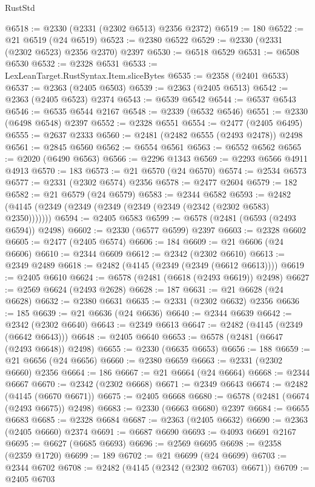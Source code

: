 \begin{lexlean}{RustStd}
\begin{coremodule}
@6518 := @2330 (@2331 (@2302 @6513) @2356 @2372)
@6519 := 180
@6522 := @21 @6519 (@24 @6519)
@6523 := @2380 @6522
@6529 := @2330 (@2331 (@2302 @6523) @2356 @2370) @2397
@6530 := @6518 @6529
@6531 := @6508 @6530
@6532 := @2328 @6531
@6533 := LexLeanTarget.RustSyntax.Item.sliceBytes
@6535 := @2358 (@2401 @6533)
@6537 := @2363 (@2405 @6503)
@6539 := @2363 (@2405 @6513)
@6542 := @2363 (@2405 @6523) @2374
@6543 := @6539 @6542
@6544 := @6537 @6543
@6546 := @6535 @6544 @2167
@6548 := @2339 (@6532 @6546)
@6551 := @2330 (@6498 @6548) @2397
@6552 := @2328 @6551
@6554 := @2477 (@2405 @6495)
@6555 := @2637 @2333
@6560 := @2481 (@2482 @6555 (@2493 @2478)) @2498
@6561 := @2845 @6560
@6562 := @6554 @6561
@6563 := @6552 @6562
@6565 := @2020 (@6490 @6563)
@6566 := @2296 @1343
@6569 := @2293 @6566 @4911 @4913
@6570 := 183
@6573 := @21 @6570 (@24 @6570)
@6574 := @2534 @6573
@6577 := @2331 (@2302 @6574) @2356
@6578 := @2477 @2604
@6579 := 182
@6582 := @21 @6579 (@24 @6579)
@6583 := @2344 @6582
@6593 := @2482 (@4145 (@2349 (@2349 (@2349 (@2349 (@2349 (@2342 (@2302 @6583) @2350)))))))
@6594 := @2405 @6583
@6599 := @6578 (@2481 (@6593 (@2493 @6594)) @2498)
@6602 := @2330 (@6577 @6599) @2397
@6603 := @2328 @6602
@6605 := @2477 (@2405 @6574)
@6606 := 184
@6609 := @21 @6606 (@24 @6606)
@6610 := @2344 @6609
@6612 := @2342 (@2302 @6610)
@6613 := @2349 @2489
@6618 := @2482 (@4145 (@2349 (@2349 (@6612 @6613))))
@6619 := @2405 @6610
@6624 := @6578 (@2481 (@6618 (@2493 @6619)) @2498)
@6627 := @2569 @6624 (@2493 @2628)
@6628 := 187
@6631 := @21 @6628 (@24 @6628)
@6632 := @2380 @6631
@6635 := @2331 (@2302 @6632) @2356
@6636 := 185
@6639 := @21 @6636 (@24 @6636)
@6640 := @2344 @6639
@6642 := @2342 (@2302 @6640)
@6643 := @2349 @6613
@6647 := @2482 (@4145 (@2349 (@6642 @6643)))
@6648 := @2405 @6640
@6653 := @6578 (@2481 (@6647 (@2493 @6648)) @2498)
@6655 := @2330 (@6635 @6653)
@6656 := 188
@6659 := @21 @6656 (@24 @6656)
@6660 := @2380 @6659
@6663 := @2331 (@2302 @6660) @2356
@6664 := 186
@6667 := @21 @6664 (@24 @6664)
@6668 := @2344 @6667
@6670 := @2342 (@2302 @6668)
@6671 := @2349 @6643
@6674 := @2482 (@4145 (@6670 @6671))
@6675 := @2405 @6668
@6680 := @6578 (@2481 (@6674 (@2493 @6675)) @2498)
@6683 := @2330 (@6663 @6680) @2397
@6684 := @6655 @6683
@6685 := @2328 @6684
@6687 := @2363 (@2405 @6632)
@6690 := @2363 (@2405 @6660) @2374
@6691 := @6687 @6690
@6693 := @4093 @6691 @2167
@6695 := @6627 (@6685 @6693)
@6696 := @2569 @6695
@6698 := @2358 (@2359 @1720)
@6699 := 189
@6702 := @21 @6699 (@24 @6699)
@6703 := @2344 @6702
@6708 := @2482 (@4145 (@2342 (@2302 @6703) @6671))
@6709 := @2405 @6703

\end{coremodule}
\end{lexlean}
